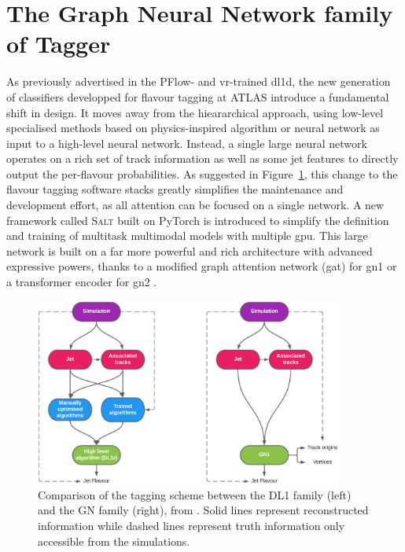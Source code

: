 
\section{The Graph Neural Network family of Tagger}\label{chap:GN}
As previously advertised in the PFlow- and \gls{vr}-trained \gls{dl1d}, the new generation of classifiers developped for flavour tagging at ATLAS introduce a fundamental shift in design. It moves away from the hieararchical approach, using low-level specialised methods based on physics-inspired algorithm or neural network as input to a high-level neural network. Instead, a single large neural network operates on a rich set of track information as well as some jet features to directly output the per-flavour probabilities. As suggested in Figure~\ref{fig:ftagArchi}, this change to the flavour tagging software stacks greatly simplifies the maintenance and development effort, as all attention can be focused on a single network. A new framework called \textsc{Salt} \cite{SaltCite} built on PyTorch \cite{pytorch} is introduced to simplify the definition and training of multitask multimodal models with multiple \gls{gpu}. This large network is built on a far more powerful and rich architecture with advanced expressive powers, thanks to a modified graph attention network (\gls{gat}) \cite{velickovic2018graph, brody2022how} for \gls{gn1} or a transformer encoder for \gls{gn2} \cite{NIPS_transformerPaper}. 

\begin{figure}[h!]
  \center
  \includegraphics[width=0.9\textwidth]{Images/FTAG/GN/Intro/schematics_difference.png}
  \caption{Comparison of the tagging scheme between the DL1 family (left) and the GN family (right), from \cite{ATL-PHYS-PUB-2022-027}. Solid lines represent reconstructed information while dashed lines represent truth information only accessible from the simulations.} 
  \label{fig:ftagArchi}
\end{figure}

